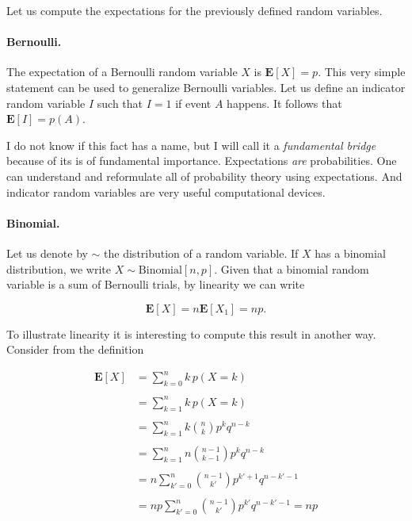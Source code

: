 \documentclass[12pt]{article}
\begin{document}
Let us compute the expectations for the previously defined random variables.

\paragraph{Bernoulli.}
The expectation of a Bernoulli random variable $X$ is $\mathbf{E} [ X ] = p$.
This very simple statement can be used to generalize Bernoulli variables.
Let us define an indicator random variable $I$ such that $I = 1$ if
event $A$ happens. It follows that $\mathbf{E} [ I ] = p(A)$.

I do not know if this fact has a name, but I will call it a \textit{fundamental bridge}
because of its is of fundamental importance.
Expectations \textit{are} probabilities. One can understand and reformulate all
of probability theory using expectations. And indicator random variables
are very useful computational devices.

\paragraph{Binomial.}
Let us denote by $\sim$ the distribution of a random variable.
If $X$ has a binomial distribution, we write $X \sim \text{Binomial}[n,p]$.
Given that a binomial random variable is a sum of Bernoulli trials, by linearity
we can write

\begin{equation}
\mathbf{E} [ X ] = n \mathbf{E} [ X_{1} ]  = np .
\end{equation} 

To illustrate linearity it is interesting to compute this result
in another way. Consider from the definition

\begin{align}
\mathbf{E} [ X ] &=
\sum_{k = 0}^{n} k \, p(X = k) 
\nonumber \\
\nonumber \\
&= \sum_{k = 1}^{n} k \, p(X = k) 
\nonumber \\
\nonumber \\
&= \sum_{k = 1}^{n} 
k { n \choose k }  p^{k} q^{n - k}
\nonumber \\
\nonumber \\
&= \sum_{k = 1}^{n}
n {n - 1 \choose k - 1}
p^{k} q^{n - k}
\nonumber \\
\nonumber \\
&= n \sum_{k' = 0}^{n}
{n - 1 \choose k' }
p^{k' + 1} q^{n - k' - 1}
\nonumber \\
\nonumber \\
&= np 
\sum_{k' = 0}^{n}
{n - 1 \choose k' }
p^{k'} q^{n - k' - 1} = np
\end{align}
\end{document}
